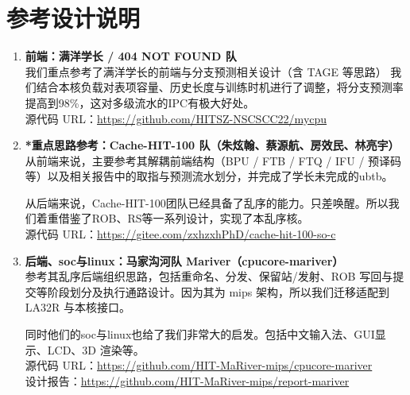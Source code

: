 \section{参考设计说明}

\begin{enumerate}
  \item \textbf{前端：满洋学长 / 404 NOT FOUND 队}\\
  我们重点参考了满洋学长的前端与分支预测相关设计（含 TAGE 等思路）
  我们结合本核负载对表项容量、历史长度与训练时机进行了调整，将分支预测率提高到98\%，这对多级流水的IPC有极大好处。\\
  源代码 URL：\url{https://github.com/HITSZ-NSCSCC22/mycpu}

  \item \textbf{*重点思路参考：Cache-HIT-100 队（朱炫翰、蔡源航、房效民、林亮宇）}\\
  从前端来说，主要参考其解耦前端结构（BPU / FTB / FTQ / IFU / 预译码等）以及相关报告中的取指与预测流水划分，并完成了学长未完成的ubtb。
  
  
  从后端来说，Cache-HIT-100团队已经具备了乱序的能力。只差唤醒。所以我们着重借鉴了ROB、RS等一系列设计，实现了本乱序核。\\
  
  
  源代码 URL：\url{https://gitee.com/zxhzxhPhD/cache-hit-100-so-c}
  

  \item \textbf{后端、soc与linux：马家沟河队 Mariver（cpucore-mariver）}\\
  参考其乱序后端组织思路，包括重命名、分发、保留站/发射、ROB 写回与提交等阶段划分及执行通路设计。因为其为 mips 架构，所以我们迁移适配到 LA32R 与本核接口。
  
  同时他们的soc与linux也给了我们非常大的启发。包括中文输入法、GUI显示、LCD、3D 渲染等。\\
  源代码 URL：\url{https://github.com/HIT-MaRiver-mips/cpucore-mariver}\\
  设计报告：\url{https://github.com/HIT-MaRiver-mips/report-mariver}


\end{enumerate}
